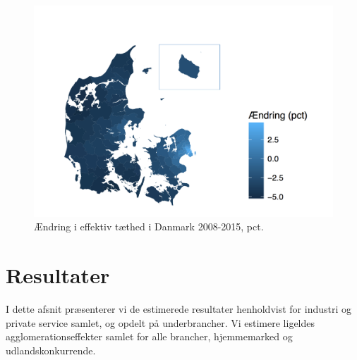 \documentclass[a4paper, 12pt, titlepage]{article}
\begin{document}
\begin{figure}[tb] 
  \centering
  \includegraphics[width=\textwidth]{andring.pdf}
  \caption{Ændring i effektiv tæthed i Danmark 2008-2015, pct.}
  \label{fig:aendring}
\end{figure}

  
  
 
 
 



\section{Resultater}
I dette afsnit præsenterer vi de estimerede resultater henholdvist for industri og private service samlet, og opdelt på underbrancher. Vi estimere ligeldes agglomerationseffekter samlet for alle brancher, hjemmemarked og udlandskonkurrende. 
\end{document}

